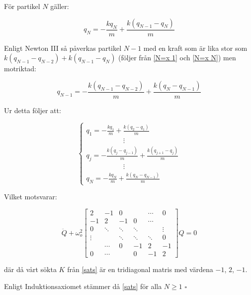 \documentclass[12pt,a4paper]{article}
\begin{document}
\begin{appendix}
		För partikel $N$ gäller:
		
		\begin{equation}
			q_N = -\frac{k q_N}{m} + \frac{k (q_{N-1} - q_N)}{m}
			\label{N=x N}
		\end{equation}
		
		Enligt Newton III så påverkas partikel $N - 1$ med en kraft som är lika stor
		som $k(q_{N-1} - q_{N-2}) + k (q_{N-1} - q_N)$ (följer från \ref{N=x 1} och \ref{N=x N})
		men motriktad:
		
		\begin{equation}
			q_{N-1} = -\frac{k(q_{N-1}-q_{N-2})}{m} + \frac{k (q_N - q_{N-1})}{m}
		\end{equation}
		
		Ur detta följer att:
		
		\begin{equation*}
			\begin{cases}
				q_1 = -\frac{k q_1}{m} + \frac{k(q_2 - q_1)}{m} \\
				\hspace{64pt} \vdots \\
				q_j = -\frac{k (q_j - q_{j-1})}{m} + \frac{k(q_{j+1}-q_j)}{m} \\
				\hspace{64pt} \vdots \\
				q_N = -\frac{k q_N}{m} + \frac{k (q_N - q_{N-1})}{m}
			\end{cases}
		\end{equation*}
		
		Vilket motsvarar:
		
		\begin{equation*}
			\ddot{Q} + \omega_o^2 \begin{bmatrix}
				2 & -1 & 0 & & \cdots & 0 \\
				-1 & 2 & -1 & 0 & \cdots & \\
				0 & \ddots & \ddots & \ddots & & \vdots \\
				\vdots &  & \ddots & \ddots & \ddots & 0 \\
				& \cdots & 0 & -1 & 2  & -1 \\
				0 & \cdots & & 0 & -1 & 2
			\end{bmatrix} Q = 0
		\end{equation*}
		
		där då vårt sökta $K$ från \ref{sats} är en tridiagonal matris med värdena $-1$, $2$, $-1$.
		
		Enligt Induktionsaxiomet stämmer då \ref{sats} för alla $N \geq 1$ \hfill $\square$
		
	\end{appendix}
\end{document}
